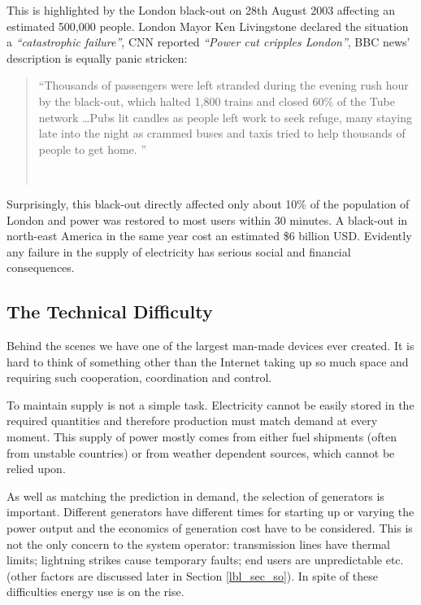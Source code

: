 \documentclass[a4paper,oneside,12pt]{report}
\newcommand{\inlinequote}[1]{\emph{``#1''}}
\newcommand{\tmpquotecite}{}%
\newenvironment{myquote}[1][]
{\renewcommand{\tmpquotecite}{#1}\begin{quote}\begin{itshape}``}
{''\end{itshape}~{\normalfont~\tmpquotecite}\end{quote}}
\begin{document}
This is highlighted by the London black-out on 28th August 2003 affecting an estimated 500,000 people. London Mayor Ken Livingstone declared the situation a \inlinequote{catastrophic failure}, CNN reported \inlinequote{Power cut cripples London}, BBC news' description is equally panic stricken:

\begin{myquote}[\cite{BBC2003}]Thousands of passengers were left stranded during the evening rush hour by the black-out, which halted 1,800 trains and closed 60\% of the Tube network \ldots Pubs lit candles as people left work to seek refuge, many staying late into the night as crammed buses and taxis tried to help thousands of people to get home.
\end{myquote}

Surprisingly, this black-out directly affected only about 10\% of the population of London and power was restored to most users within 30 minutes. A black-out in north-east America in the same year cost an estimated \$6 billion USD. Evidently any failure in the supply of electricity has serious social and financial consequences.

\subsection{The Technical Difficulty}

Behind the scenes we have one of the largest man-made devices ever created. It is hard to think of something other than the Internet taking up so much space and requiring such cooperation, coordination and control.

To maintain supply is not a simple task. Electricity cannot be easily stored in the required quantities and therefore production must match demand at every moment. This supply of power mostly comes from either fuel shipments (often from unstable countries) or from weather dependent sources, which cannot be relied upon.

As well as matching the prediction in demand, the selection of generators is important. Different generators have different times for starting up or varying the power output and the economics of generation cost have to be considered. This is not the only concern to the system operator: transmission lines have thermal limits; lightning strikes cause temporary faults; end users are unpredictable etc. (other factors are discussed later in Section \ref{lbl_sec_so}). In spite of these difficulties energy use is on the rise.
\end{document}
